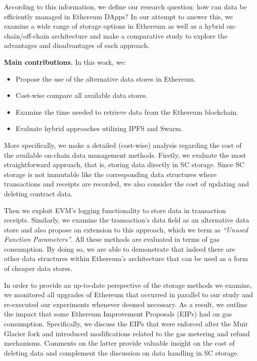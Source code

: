 According to this information, we define our research question: how can data be efficiently managed in Ethereum DApps?
In our attempt to answer this, we examine a wide range of storage options in Ethereum as well as a hybrid on-chain/off-chain architecture and make a comparative study to explore the advantages and disadvantages of each approach. 

{\bf Main contributions.} In this work, we:
\begin{itemize}[topsep=0pt, itemsep=0pt]
\item{Propose the use of the alternative data stores in Ethereum.}
\item{Cost-wise compare all available data stores.}
\item{Examine the time needed to retrieve data from the Ethereum blockchain.}
\item{Evaluate hybrid approaches utilizing IPFS and Swarm.}
\end{itemize}

More specifically, we make a detailed (cost-wise) analysis regarding the cost of the available on-chain data management methods. Firstly, we evaluate the most straightforward approach, that is, storing data directly in SC storage. Since SC storage is not immutable like the corresponding data structures where transactions and receipts are recorded, we also consider the cost of updating and deleting contract data. 

Then we exploit EVM’s logging functionality to store data in transaction receipts. Similarly, we examine the transaction's data field as an alternative data store and also propose an extension to this approach, which we term as \emph{``Unused Function Parameters''}. All these methods are evaluated in terms of gas consumption. By doing so, we are able to demonstrate that indeed there are other data structures within Ethereum’s architecture that can be used as a form of cheaper data stores.


In order to provide an up-to-date perspective of the storage methods we examine, we monitored all upgrades of Ethereum that occurred in parallel to our study and re-executed our experiments whenever deemed necessary. As a result, we outline the impact that some Ethereum Improvement Proposals (EIPs) had on gas consumption. Specifically, we discuss the EIPs that were enforced after the Muir Glacier fork and introduced modifications related to the gas metering and refund mechanisms. Comments on the latter provide valuable insight on the cost of deleting data and complement the discussion on data handling in SC storage.

